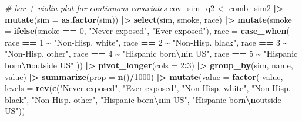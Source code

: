 \documentclass[12pt, twoside]{amherstthesis}
\newenvironment{Shaded}{\begin{snugshade}}{\end{snugshade}}
\newcommand{\AttributeTok}[1]{\textcolor[rgb]{0.13,0.29,0.53}{#1}}
\newcommand{\CommentTok}[1]{\textcolor[rgb]{0.56,0.35,0.01}{\textit{#1}}}
\newcommand{\DecValTok}[1]{\textcolor[rgb]{0.00,0.00,0.81}{#1}}
\newcommand{\FunctionTok}[1]{\textcolor[rgb]{0.13,0.29,0.53}{\textbf{#1}}}
\newcommand{\NormalTok}[1]{#1}
\newcommand{\OtherTok}[1]{\textcolor[rgb]{0.56,0.35,0.01}{#1}}
\newcommand{\SpecialCharTok}[1]{\textcolor[rgb]{0.81,0.36,0.00}{\textbf{#1}}}
\newcommand{\StringTok}[1]{\textcolor[rgb]{0.31,0.60,0.02}{#1}}
\begin{document}
\begin{Shaded}
\begin{Highlighting}[]
\CommentTok{\# bar + violin plot for continuous covariates}
\NormalTok{cov\_sim\_q2 }\OtherTok{\textless{}{-}}\NormalTok{ comb\_sim2 }\SpecialCharTok{|\textgreater{}} 
  \FunctionTok{mutate}\NormalTok{(}\AttributeTok{sim =} \FunctionTok{as.factor}\NormalTok{(sim)) }\SpecialCharTok{|\textgreater{}} 
  \FunctionTok{select}\NormalTok{(sim, smoke, race) }\SpecialCharTok{|\textgreater{}} 
  \FunctionTok{mutate}\NormalTok{(}\AttributeTok{smoke =} \FunctionTok{ifelse}\NormalTok{(smoke }\SpecialCharTok{==} \DecValTok{0}\NormalTok{, }\StringTok{"Never{-}exposed"}\NormalTok{, }\StringTok{"Ever{-}exposed"}\NormalTok{), }
         \AttributeTok{race =} \FunctionTok{case\_when}\NormalTok{(}
\NormalTok{           race }\SpecialCharTok{==} \DecValTok{1} \SpecialCharTok{\textasciitilde{}} \StringTok{"Non{-}Hisp. white"}\NormalTok{, }
\NormalTok{           race }\SpecialCharTok{==} \DecValTok{2} \SpecialCharTok{\textasciitilde{}} \StringTok{"Non{-}Hisp. black"}\NormalTok{, }
\NormalTok{           race }\SpecialCharTok{==} \DecValTok{3} \SpecialCharTok{\textasciitilde{}} \StringTok{"Non{-}Hisp. other"}\NormalTok{, }
\NormalTok{           race }\SpecialCharTok{==} \DecValTok{4} \SpecialCharTok{\textasciitilde{}} \StringTok{"Hispanic born}\SpecialCharTok{\textbackslash{}n}\StringTok{in US"}\NormalTok{, }
\NormalTok{           race }\SpecialCharTok{==} \DecValTok{5} \SpecialCharTok{\textasciitilde{}} \StringTok{"Hispanic born}\SpecialCharTok{\textbackslash{}n}\StringTok{outside US"}
\NormalTok{         )) }\SpecialCharTok{|\textgreater{}} 
  \FunctionTok{pivot\_longer}\NormalTok{(}\AttributeTok{cols =} \DecValTok{2}\SpecialCharTok{:}\DecValTok{3}\NormalTok{) }\SpecialCharTok{|\textgreater{}} 
  \FunctionTok{group\_by}\NormalTok{(sim, name, value) }\SpecialCharTok{|\textgreater{}} 
  \FunctionTok{summarize}\NormalTok{(}\AttributeTok{prop =} \FunctionTok{n}\NormalTok{()}\SpecialCharTok{/}\DecValTok{1000}\NormalTok{) }\SpecialCharTok{|\textgreater{}} 
  \FunctionTok{mutate}\NormalTok{(}\AttributeTok{value =} \FunctionTok{factor}\NormalTok{(}
\NormalTok{    value, }\AttributeTok{levels =} \FunctionTok{rev}\NormalTok{(}\FunctionTok{c}\NormalTok{(}\StringTok{"Never{-}exposed"}\NormalTok{, }\StringTok{"Ever{-}exposed"}\NormalTok{,}
                          \StringTok{"Non{-}Hisp. white"}\NormalTok{, }\StringTok{"Non{-}Hisp. black"}\NormalTok{, }\StringTok{"Non{-}Hisp. other"}\NormalTok{, }
                          \StringTok{"Hispanic born}\SpecialCharTok{\textbackslash{}n}\StringTok{in US"}\NormalTok{, }\StringTok{"Hispanic born}\SpecialCharTok{\textbackslash{}n}\StringTok{outside US"}\NormalTok{))}

\end{Highlighting}
\end{Shaded}
\end{document}
